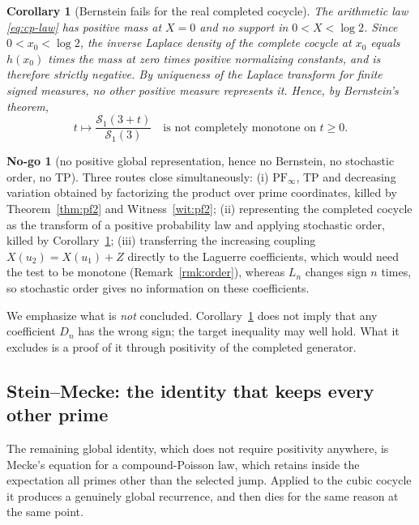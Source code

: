 \documentclass[11pt]{amsart}
\newtheorem{corollary}[theorem]{Corollary}
\theoremstyle{definition}
\theoremstyle{remark}
\theoremstyle{definition}
\newtheorem{nogo}{No-go}[section]
\begin{document}
\begin{corollary}[Bernstein fails for the real completed cocycle]\label{cor:bernstein}
The arithmetic law \eqref{eq:cp-law} has positive mass at $X=0$ and no support in
$0<X<\log2$. Since $0<x_0<\log2$, the inverse Laplace density of the \emph{complete} cocycle at
$x_0$ equals $h(x_0)$ times the mass at zero times positive normalizing constants, and is
therefore strictly negative. By uniqueness of the Laplace transform for finite signed measures,
no other positive measure represents it. Hence, by Bernstein's theorem,
\begin{equation}\label{eq:not-cm}
   t\longmapsto\frac{\mathcal S_1(3+t)}{\mathcal S_1(3)}
   \quad\text{is not completely monotone on }t\ge0 .
\end{equation}
\end{corollary}

\begin{nogo}[no positive global representation, hence no Bernstein, no stochastic order, no
$\mathrm{TP}$]\label{ng:cm}
Three routes close simultaneously: (i) $\mathrm{PF}_\infty$, $\mathrm{TP}$ and decreasing
variation obtained by factorizing the product over prime coordinates, killed by
Theorem~\ref{thm:pf2} and Witness~\ref{wit:pf2}; (ii) representing the completed cocycle as the
transform of a positive probability law and applying stochastic order, killed by
Corollary~\ref{cor:bernstein}; (iii) transferring the increasing coupling
$X(u_2)=X(u_1)+Z$ directly to the Laguerre coefficients, which would need the test to be monotone
(Remark~\ref{rmk:order}), whereas $L_n$ changes sign $n$ times, so stochastic order gives no
information on these coefficients.
\end{nogo}

\noindent We emphasize what is \emph{not} concluded. Corollary~\ref{cor:bernstein} does not imply
that any coefficient $D_n$ has the wrong sign; the target inequality may well hold. What it excludes is a
proof of it through positivity of the completed generator.

\subsection{Stein--Mecke: the identity that keeps every other prime}\label{sec:stein}

The remaining global identity, which does not require positivity anywhere, is Mecke's equation for a compound-Poisson law, which retains inside the
expectation all primes other than the selected jump. Applied to the cubic cocycle it produces a
genuinely global recurrence, and then dies for the same reason at the same point.
\end{document}
